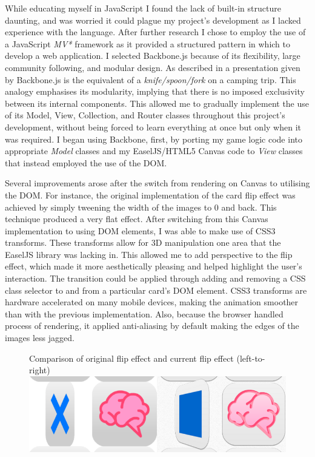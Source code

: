 \documentclass[final]{cmpreport}
\begin{document}
While educating myself in JavaScript I found the lack of built-in structure daunting, and was worried it could plague my project's development as I lacked experience with the language. After further research I chose to employ the use of a JavaScript \textit{MV*} framework as it provided a structured pattern in which to develop a web application. I selected Backbone.js \footnotemark because of its flexibility, large community following, and modular design. As described in a presentation given by \citet{Bull} Backbone.js is the equivalent of a \textit{knife/spoon/fork} on a camping trip. This analogy emphasises its modularity, implying that there is no imposed exclusivity between its internal components. This allowed me to gradually implement the use of its Model, View, Collection, and Router classes throughout this project's development, without being forced to learn everything at once but only when it was required. I began using Backbone, first, by porting my game logic code into appropriate \textit{Model} classes and my EaselJS/HTML5 Canvas code to \textit{View} classes that instead employed the use of the DOM.

Several improvements arose after the switch from rendering on Canvas to utilising the DOM. For instance, the original implementation of the card flip effect was achieved by simply tweening the width of the images to 0 and back. This technique produced a very flat effect. After switching from this Canvas implementation to using DOM elements, I was able to make use of CSS3 transforms. These transforms allow for 3D manipulation one area that the EaselJS library was lacking in. This allowed me to add perspective to the flip effect, which made it more aesthetically pleasing and helped highlight the user's interaction. The transition could be applied through adding and removing a CSS class selector to and from a particular card's DOM element. CSS3 transforms are hardware accelerated on many mobile devices, making the animation smoother than with the previous implementation. Also, because the browser handled process of rendering, it applied anti-aliasing by default making the edges of the images less jagged.

\begin{figure}[h!]{Comparison of original flip effect and current flip effect (left-to-right)\label{transforms}}
  \includegraphics[width=1.0\textwidth]{transforms.png}
\end{figure}
\end{document}
